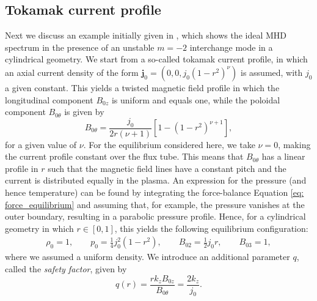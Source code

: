 \subsection{Tokamak current profile}
Next we discuss an example initially given in \citet{kerner1985}, which shows the ideal MHD spectrum in the presence of an unstable $m = -2$ interchange mode in a cylindrical geometry. We start from a so-called tokamak current profile, in which an axial current density of the form $\boldsymbol{j}_0 = \left(0, 0, j_0(1 - r^2)^\nu\right)$ is assumed, with $j_0$ a given constant. This yields a twisted magnetic field profile in which the longitudinal component $B_{0z}$ is uniform and equals one, while the poloidal component $B_{0\theta}$ is given by
\begin{equation} \label{eq: tokamak_btheta}
  B_{0\theta} = \frac{j_0}{2r\left(\nu + 1\right)}\left[1 - \left(1 - r^2\right)^{\nu + 1}\right],
\end{equation}
for a given value of $\nu$. For the equilibrium considered here, we take $\nu = 0$, making the current profile constant over the flux tube. This means that $B_{0\theta}$ has a linear profile in $r$ such that the magnetic field lines have a constant pitch and the current is distributed equally in the plasma. An expression for the pressure (and hence temperature) can be found by integrating the force-balance Equation \eqref{eq: force_equilibrium} and assuming that, for example, the pressure vanishes at the outer boundary, resulting in a parabolic pressure profile. Hence, for a cylindrical geometry in which $r \in [0, 1]$, this yields the following equilibrium configuration:
\begin{equation}
  \begin{gathered}
    \rho_0 = 1,
    \qquad
    p_0 = \frac{1}{4}j_0^2\left(1 - r^2\right),
    \qquad
    B_{02} = \frac{1}{2}j_0 r,
    \qquad
    B_{03} = 1,
  \end{gathered}
\end{equation}
where we assumed a uniform density. We introduce an additional parameter $q$, called the \emph{safety factor}, given by
\begin{equation}
  q(r) = \frac{rk_z B_{0z}}{B_{0\theta}} = \frac{2k_z}{j_0}.
\end{equation}

